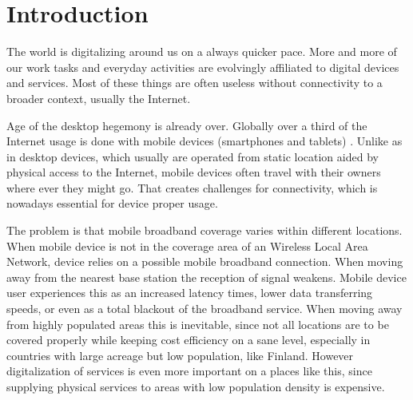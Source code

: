 \chapter{Introduction}







The world is digitalizing around us on a always quicker pace. More and more of our work tasks and everyday activities are evolvingly affiliated to digital devices and services. Most of these things are often useless without connectivity to a broader context, usually the Internet.


Age of the desktop hegemony is already over. Globally over a third of the Internet usage is done with mobile devices (smartphones and tablets) \cite{statcounter_global_????}. Unlike as in desktop devices, which usually are operated from static location aided by physical access to the Internet, mobile devices often travel with their owners where ever they might go. That creates challenges for connectivity, which is nowadays essential for device proper usage.

The problem is that mobile broadband coverage varies within different locations. When mobile device is not in the coverage area of an Wireless Local Area Network, device relies on a possible mobile broadband connection. When moving away from the nearest base station the reception of signal weakens. Mobile device user experiences this as an increased latency times, lower data transferring speeds, or even as a total blackout of the broadband service. When moving away from highly populated areas this is inevitable, since not all locations are to be covered properly while keeping cost efficiency on a sane level, especially in countries with large acreage but low population, like Finland. However digitalization of services is even more important on a places like this, since supplying physical services to areas with low population density is expensive. 


